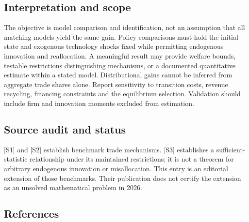 \documentclass[11pt,a4paper]{article}
\begin{document}
\subsection*{Interpretation and scope}
The objective is model comparison and identification, not an assumption that all matching models yield the same gain. Policy comparisons must hold the initial state and exogenous technology shocks fixed while permitting endogenous innovation and reallocation. A meaningful result may provide welfare bounds, testable restrictions distinguishing mechanisms, or a documented quantitative estimate within a stated model. Distributional gains cannot be inferred from aggregate trade shares alone. Report sensitivity to transition costs, revenue recycling, financing constraints and the equilibrium selection. Validation should include firm and innovation moments excluded from estimation.

\subsection*{Source audit and status}
[S1] and [S2] establish benchmark trade mechanisms. [S3] establishes a sufficient-statistic relationship under its maintained restrictions; it is not a theorem for arbitrary endogenous innovation or misallocation. This entry is an editorial extension of those benchmarks. Their publication does not certify the extension as an unsolved mathematical problem in 2026.

\subsection*{References}
\end{document}
